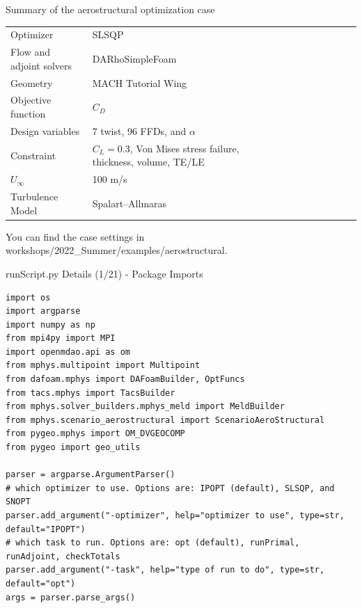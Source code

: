 \documentclass{bredelebeamer}
\begin{document}
\begin{frame}{Summary of the aerostructural optimization case}

  \begin{table}
    \renewcommand{\arraystretch}{1.5}
    \small
    \centering
    \label{tab:implemented_models}
    \begin{tabular}{llllllllllll}
    \hline
    Optimizer   & SLSQP \\
    Flow and adjoint solvers  & DARhoSimpleFoam  \\
    Geometry  & MACH Tutorial Wing \\
    Objective function  & $C_D$ \\
    Design variables &7 twist, 96 FFDs, and $\alpha$ \\
    Constraint & \makecell[l]{$C_L=0.3$, Von Mises stress failure, thickness,\\volume, TE/LE}\\
    $U_\infty$  & 100 m/s \\
    Turbulence Model  & Spalart--Allmaras\\
     \hline
    \end{tabular}
  \end{table}

  You can find the case settings in workshops/2022\_Summer/examples/aerostructural.
\end{frame}

\begin{frame}[fragile]{runScript.py Details (1/21) - \large Package Imports}
\scriptsize
\lstset{ language=bash }
\begin{lstlisting}
import os
import argparse
import numpy as np
from mpi4py import MPI
import openmdao.api as om
from mphys.multipoint import Multipoint
from dafoam.mphys import DAFoamBuilder, OptFuncs
from tacs.mphys import TacsBuilder
from mphys.solver_builders.mphys_meld import MeldBuilder
from mphys.scenario_aerostructural import ScenarioAeroStructural
from pygeo.mphys import OM_DVGEOCOMP
from pygeo import geo_utils

parser = argparse.ArgumentParser()
# which optimizer to use. Options are: IPOPT (default), SLSQP, and SNOPT
parser.add_argument("-optimizer", help="optimizer to use", type=str, default="IPOPT")
# which task to run. Options are: opt (default), runPrimal, runAdjoint, checkTotals
parser.add_argument("-task", help="type of run to do", type=str, default="opt")
args = parser.parse_args()
\end{lstlisting}
\normalsize
\end{frame}
\end{document}
